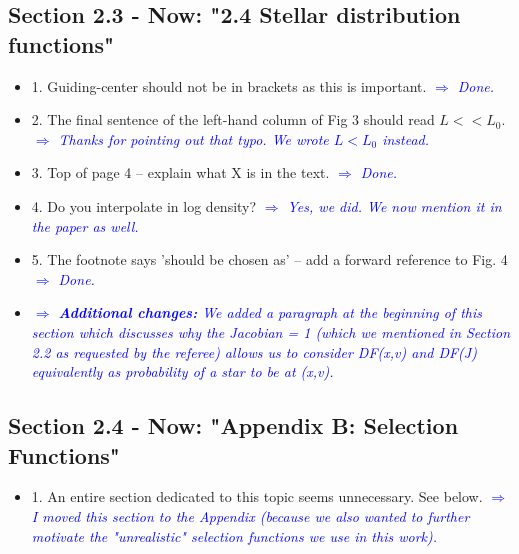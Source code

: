 \documentclass[10pt,a4paper]{article}
\newcommand{\Comment}[1]{\textsl{\textcolor{Blue}{$\Longrightarrow$ {#1}}}}
\begin{document}
\subsection{Section 2.3 - Now: "2.4 Stellar distribution functions"}
\begin{itemize}
\item 1. Guiding-center should not be in brackets as this is important. \Comment{Done.}
\item 2. The final sentence of the left-hand column of Fig 3 should read $L<<L_0$. \Comment{Thanks for pointing out that typo. We wrote $L < L_0$ instead.}
\item 3. Top of page 4 -- explain what X is in the text. \Comment{Done.}
\item 4. Do you interpolate in log density? \Comment{Yes, we did. We now mention it in the paper as well.}
\item 5. The footnote says 'should be chosen as' -- add a forward reference to Fig. 4 \Comment{Done.}
\item \Comment{\textbf{Additional changes:} We added a paragraph at the beginning of this section which discusses why the Jacobian = 1 (which we mentioned in Section 2.2 as requested by the referee) allows us to consider DF(x,v) and DF(J) equivalently as probability of a star to be at (x,v).}
\end{itemize}

\subsection{Section 2.4 - Now: "Appendix B: Selection Functions"}
\begin{itemize}
\item 1. An entire section dedicated to this topic seems unnecessary. See below. \Comment{I moved this section to the Appendix (because we also wanted to further motivate the "unrealistic" selection functions we use in this work).}
\end{itemize}
\end{document}
